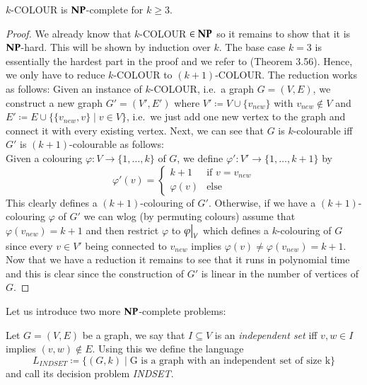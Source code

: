 \begin{Theorem}
  $k$-COLOUR is $\mathbf{NP}$-complete for $k \geq 3$.
\end{Theorem}

\begin{proof}
 We already know that $k$-COLOUR $\in \mathbf{NP}$ so it remains to show that it is $\mathbf{NP}$-hard.
 This will be shown by induction over $k$.
 The base case $k = 3$ is essentially the hardest part in the proof and we refer to \cite{JorgRothe2008} (Theorem 3.56).
 Hence, we only have to reduce $k$-COLOUR to $(k+1)$-COLOUR. The reduction works as follows: \newline
 Given an instance of $k$-COLOUR, i.e.\ 
 a graph $G = (V,E)$, we construct a new graph $G' = (V', E')$ where $V' \coloneqq V \cup \lbrace v_{new} \rbrace$ with
 $v_{new} \notin V$ and $E' \coloneqq E \cup \lbrace \lbrace v_{new}, v \rbrace \; | \; v \in V \rbrace$, i.e.\ we just add one new vertex to the graph
 and connect it with every existing vertex. Next, we can see that $G$ is $k$-colourable iff $G'$ is $(k+1)$-colourable as follows: \\
 Given a colouring $\varphi \colon V \to {\lbrace 1,\ldots,k \rbrace}$ of $G$, we define 
 $\varphi' \colon V' \to { \lbrace 1, \ldots, k+1 \rbrace }$
 by 
 $$ \varphi'(v) = \begin{cases}
                   k + 1 &\text{if $v = v_{new}$} \\
                   \varphi(v) &\text{else}
                  \end{cases}
$$
 This clearly defines a $(k+1)$-colouring of $G'$. Otherwise, if we have a $(k+1)$-colouring $\varphi$ of 
 $G'$ we can wlog (by permuting colours) assume that $\varphi (v_{new}) = k+1$ and then
 restrict $\varphi$ to $\restr{\varphi}{V}$ which defines a $k$-colouring of $G$ since every $v \in V'$ being connected
 to $v_{new}$ implies $\varphi(v) \neq \varphi(v_{new}) = k+1$. \\
 Now that we have a reduction it remains to see that it runs in polynomial time and this is clear since
 the construction of $G'$ is linear in the number of vertices of $G$.
 
\end{proof}

Let us introduce two more $\mathbf{NP}$-complete problems:
\begin{Problem}
 Let $G = (V,E)$ be a graph, we say that $I \subseteq V$ is an \emph{independent set} iff 
  $v,w \in I$ implies $(v,w) \notin E$. Using this we define the language
  $$L_{INDSET} \coloneqq \lbrace (G,k) \; | \; \text{G is a graph with an independent set of size k} \rbrace $$
  and call its decision problem \emph{INDSET}.
\end{Problem}

